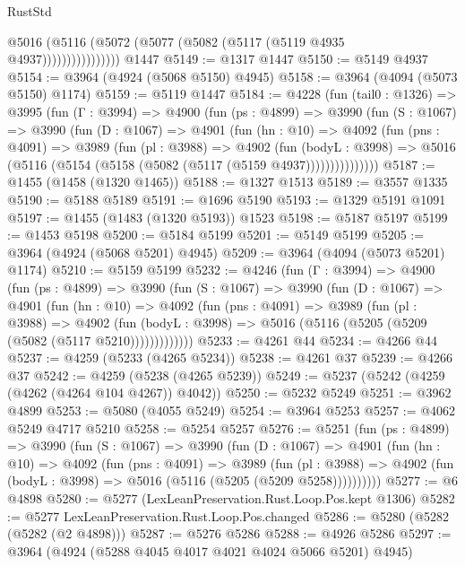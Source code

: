 \begin{lexlean}{RustStd}
\begin{coremodule}
{\begin{coremodule}
{{{{{{{{{{{{{{{{{{{{{{{{{{{{{{{{{{{{{{                      @5016 (@5116 (@5072 (@5077 (@5082 (@5117 (@5119 @4935 @4937))))))))))))))))
    @1447
@5149 := @1317 @1447
@5150 := @5149 @4937
@5154 := @3964 (@4924 (@5068 @5150) @4945)
@5158 := @3964 (@4094 (@5073 @5150) @1174)
@5159 := @5119 @1447
@5184 := @4228
    (fun (tail0 : @1326) =>
    @3995
      (fun (Γ : @3994) =>
      @4900
        (fun (ps : @4899) =>
        @3990
          (fun (S : @1067) =>
          @3990
            (fun (D : @1067) =>
            @4901
              (fun (hn : @10) =>
              @4092
                (fun (pns : @4091) =>
                @3989
                  (fun (pl : @3988) =>
                  @4902
                    (fun (bodyL : @3998) =>
                    @5016 (@5116 (@5154 (@5158 (@5082 (@5117 (@5159 @4937)))))))))))))))
@5187 := @1455 (@1458 (@1320 @1465))
@5188 := @1327 @1513
@5189 := @3557 @1335
@5190 := @5188 @5189
@5191 := @1696 @5190
@5193 := @1329 @5191 @1091
@5197 := @1455 (@1483 (@1320 @5193)) @1523
@5198 := @5187 @5197
@5199 := @1453 @5198
@5200 := @5184 @5199
@5201 := @5149 @5199
@5205 := @3964 (@4924 (@5068 @5201) @4945)
@5209 := @3964 (@4094 (@5073 @5201) @1174)
@5210 := @5159 @5199
@5232 := @4246
    (fun (Γ : @3994) =>
    @4900
      (fun (ps : @4899) =>
      @3990
        (fun (S : @1067) =>
        @3990
          (fun (D : @1067) =>
          @4901
            (fun (hn : @10) =>
            @4092
              (fun (pns : @4091) =>
              @3989
                (fun (pl : @3988) =>
                @4902
                  (fun (bodyL : @3998) =>
                  @5016 (@5116 (@5205 (@5209 (@5082 (@5117 @5210)))))))))))))
@5233 := @4261 @44
@5234 := @4266 @44
@5237 := @4259 (@5233 (@4265 @5234))
@5238 := @4261 @37
@5239 := @4266 @37
@5242 := @4259 (@5238 (@4265 @5239))
@5249 := @5237 (@5242 (@4259 (@4262 (@4264 @104 @4267)) @4042))
@5250 := @5232 @5249
@5251 := @3962 @4899
@5253 := @5080 (@4055 @5249)
@5254 := @3964 @5253
@5257 := @4062 @5249 @4717 @5210
@5258 := @5254 @5257
@5276 := @5251
    (fun (ps : @4899) =>
    @3990
      (fun (S : @1067) =>
      @3990
        (fun (D : @1067) =>
        @4901
          (fun (hn : @10) =>
          @4092
            (fun (pns : @4091) =>
            @3989
              (fun (pl : @3988) =>
              @4902 (fun (bodyL : @3998) => @5016 (@5116 (@5205 (@5209 @5258))))))))))
@5277 := @6 @4898
@5280 := @5277 (LexLeanPreservation.Rust.Loop.Pos.kept @1306)
@5282 := @5277 LexLeanPreservation.Rust.Loop.Pos.changed
@5286 := @5280 (@5282 (@5282 (@2 @4898)))
@5287 := @5276 @5286
@5288 := @4926 @5286
@5297 := @3964 (@4924 (@5288 @4045 @4017 @4021 @4024 @5066 @5201) @4945)
}}}}}}}}}}}}}}}}}}}}}}}}}}}}}}}}}}}}}}
\end{coremodule}}
\end{coremodule}
\end{lexlean}
